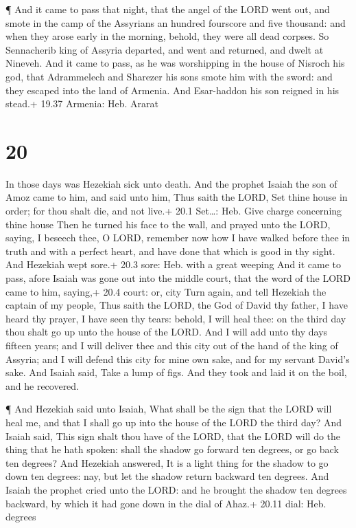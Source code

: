  ¶ And it came to pass that night, that the angel of the
LORD went out, and smote in the camp of the Assyrians an hundred
fourscore and five thousand: and when they arose early in the morning,
behold, they were all dead corpses.  So Sennacherib king of
Assyria departed, and went and returned, and dwelt at Nineveh.
 And it came to pass, as he was worshipping in the house of
Nisroch his god, that Adrammelech and Sharezer his sons smote him with
the sword: and they escaped into the land of Armenia. And Esar-haddon
his son reigned in his stead.+ 19.37 Armenia: Heb. Ararat

\hypertarget{section-19}{%
\section{20}\label{section-19}}

 In those days was Hezekiah sick unto death. And the prophet
Isaiah the son of Amoz came to him, and said unto him, Thus saith the
LORD, Set thine house in order; for thou shalt die, and not live.+ 20.1
Set\ldots: Heb. Give charge concerning thine house  Then he
turned his face to the wall, and prayed unto the LORD, saying,
 I beseech thee, O LORD, remember now how I have walked
before thee in truth and with a perfect heart, and have done that which
is good in thy sight. And Hezekiah wept sore.+ 20.3 sore: Heb. with a
great weeping  And it came to pass, afore Isaiah was gone
out into the middle court, that the word of the LORD came to him,
saying,+ 20.4 court: or, city  Turn again, and tell Hezekiah
the captain of my people, Thus saith the LORD, the God of David thy
father, I have heard thy prayer, I have seen thy tears: behold, I will
heal thee: on the third day thou shalt go up unto the house of the LORD.
 And I will add unto thy days fifteen years; and I will
deliver thee and this city out of the hand of the king of Assyria; and I
will defend this city for mine own sake, and for my servant David's
sake.  And Isaiah said, Take a lump of figs. And they took
and laid it on the boil, and he recovered.

 ¶ And Hezekiah said unto Isaiah, What shall be the sign
that the LORD will heal me, and that I shall go up into the house of the
LORD the third day?  And Isaiah said, This sign shalt thou
have of the LORD, that the LORD will do the thing that he hath spoken:
shall the shadow go forward ten degrees, or go back ten degrees?
 And Hezekiah answered, It is a light thing for the shadow
to go down ten degrees: nay, but let the shadow return backward ten
degrees.  And Isaiah the prophet cried unto the LORD: and
he brought the shadow ten degrees backward, by which it had gone down in
the dial of Ahaz.+ 20.11 dial: Heb. degrees


